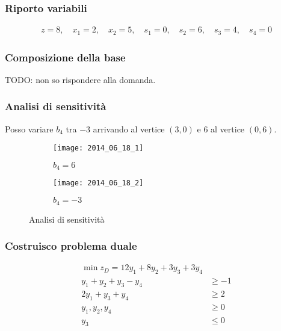 \documentclass[\main/main.tex]{subfiles}
\begin{document}
\subsubsection*{Riporto variabili}

\begin{align*}
  z = 8, \quad
  x_1 = 2, \quad
  x_2 = 5, \quad
  s_1 = 0, \quad
  s_2 = 6, \quad
  s_3 = 4, \quad
  s_4 = 0
\end{align*}
\subsubsection*{Composizione della base}
TODO: non so rispondere alla domanda.

\subsubsection*{Analisi di sensitività}
Posso variare $b_4$ tra $-3$ arrivando al vertice $(3,0)$ e $6$ al vertice $(0,6)$.

\begin{figure}
  \begin{subfigure}{0.49\textwidth}
    \texttt{[image: 2014\_06\_18\_1]}
    \caption{$b_4 = 6$}
  \end{subfigure}
  \begin{subfigure}{0.49\textwidth}
    \texttt{[image: 2014\_06\_18\_2]}
    \caption{$b_4 = -3$}
  \end{subfigure}
  \caption{Analisi di sensitività}
\end{figure}

\subsubsection*{Costruisco problema duale}
\begin{align*}
  \min z_D = 12y_1 + 8y_2 + 3y_3 + 3y_4 \\
  y_1 + y_2 + y_3 -y_4 & \geq -1        \\
  2y_1 + y_3 + y_4     & \geq 2         \\
  y_1, y_2, y_4        & \geq 0         \\
  y_3                  & \leq 0
\end{align*}
\end{document}
